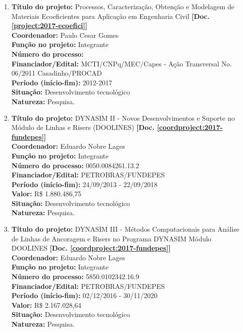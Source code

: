 \documentclass[a4paper,oneside,10pt]{article}
\begin{document}
\begin{enumerate}
      
\item \textbf{Título do projeto:} Processos, Caracterização, Obtenção e Modelagem de Materiais Ecoeficientes para Aplicação em Engenharia Civil  \textbf{[Doc. \ref{project:2017-ecoefici}]}\\
      \textbf{Coordenador:} Paulo Cesar Gomes\\
      \textbf{Função no projeto:} Integrante\\
      \textbf{Número do processo:}\\
      \textbf{Financiador/Edital:} MCTI/CNPq/MEC/Capes - Ação Transversal No. 06/2011 Casadinho/PROCAD\\
      \textbf{Período (início-fim):} 2012-2017\\
      \textbf{Situação:} Desenvolvimento tecnológico\\
      \textbf{Natureza:} Pesquisa.
      
             
\item \textbf{Título do projeto:} DYNASIM II - Novos Desenvolvimentos e Suporte no Módulo de Linhas e Risers (DOOLINES) \textbf{[Doc. \ref{coordproject:2017-fundepes}]}\\
      \textbf{Coordenador:} Eduardo Nobre Lages\\
      \textbf{Função no projeto:} Integrante\\
      \textbf{Número do processo:} 0050.0084261.13.2\\
      \textbf{Financiador/Edital:} PETROBRAS/FUNDEPES\\
      \textbf{Período (início-fim):} 24/09/2013 - 22/09/2018\\
       \textbf{Valor:} R\$ 1.880.486,75 \\
      \textbf{Situação:} Desenvolvimento tecnológico\\
      \textbf{Natureza:} Pesquisa.  
      \\

 \item \textbf{Título do projeto:} DYNASIM III - Métodos Computacionais para Análise de Linhas de Ancoragem e Risers no Programa DYNASIM Módulo DOOLINES  \textbf{[Doc. \ref{coordproject:2017-fundepes}]}\\
      \textbf{Coordenador:} Eduardo Nobre Lages\\
      \textbf{Função no projeto:} Integrante\\
      \textbf{Número do processo:} 	 5850.0102342.16.9\\
      \textbf{Financiador/Edital:} PETROBRAS/FUNDEPES\\
      \textbf{Período (início-fim):} 02/12/2016 - 30/11/2020\\
      \textbf{Valor:} R\$ 2.167.028,64 \\
      \textbf{Situação:} Desenvolvimento tecnológico\\
      \textbf{Natureza:} Pesquisa.  
      

\end{enumerate}
\end{document}
